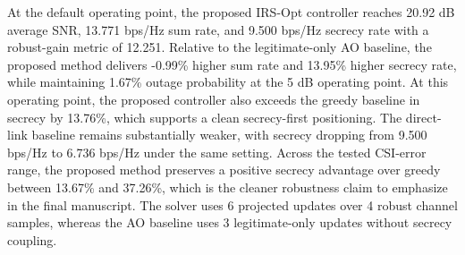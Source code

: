 At the default operating point, the proposed IRS-Opt controller reaches 20.92 dB average SNR, 13.771 bps/Hz sum rate, and 9.500 bps/Hz secrecy rate with a robust-gain metric of 12.251. Relative to the legitimate-only AO baseline, the proposed method delivers -0.99\% higher sum rate and 13.95\% higher secrecy rate, while maintaining 1.67\% outage probability at the 5 dB operating point. At this operating point, the proposed controller also exceeds the greedy baseline in secrecy by 13.76\%, which supports a clean secrecy-first positioning. The direct-link baseline remains substantially weaker, with secrecy dropping from 9.500 bps/Hz to 6.736 bps/Hz under the same setting. Across the tested CSI-error range, the proposed method preserves a positive secrecy advantage over greedy between 13.67\% and 37.26\%, which is the cleaner robustness claim to emphasize in the final manuscript. The solver uses 6 projected updates over 4 robust channel samples, whereas the AO baseline uses 3 legitimate-only updates without secrecy coupling.

